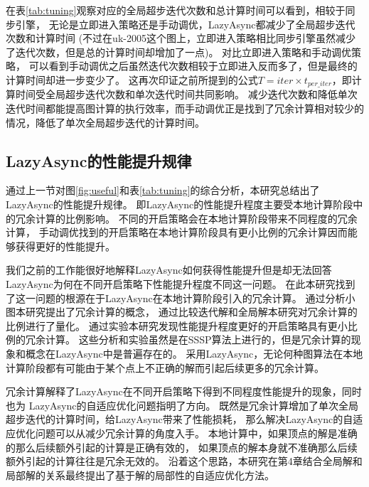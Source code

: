 在表\ref{tab:tuning}观察对应的全局超步迭代次数和总计算时间可以看到，相较于同步引擎，
无论是立即进入策略还是手动调优，LazyAsync都减少了全局超步迭代次数和计算时间
(不过在uk-2005这个图上，立即进入策略相比同步引擎虽然减少了迭代次数，但是总的计算时间却增加了一点)。
对比立即进入策略和手动调优策略， 可以看到手动调优之后虽然迭代次数相较于立即进入反而多了，但是最终的计算时间却进一步变少了。
这再次印证之前所提到的公式$T=iter \times t_{per\_iter}$，即计算时间受全局超步迭代次数和单次迭代时间共同影响。
减少迭代次数和降低单次迭代时间都能提高图计算的执行效率，而手动调优正是找到了冗余计算相对较少的情况，降低了单次全局超步迭代的计算时间。


\subsection{LazyAsync的性能提升规律}

通过上一节对图\ref{fig:useful}和表\ref{tab:tuning}的综合分析，本研究总结出了LazyAsync的性能提升规律。
即LazyAsync的性能提升程度主要受本地计算阶段中的冗余计算的比例影响。
不同的开启策略会在本地计算阶段带来不同程度的冗余计算，
手动调优找到的开启策略在本地计算阶段具有更小比例的冗余计算因而能够获得更好的性能提升。

我们之前的工作能很好地解释LazyAsync如何获得性能提升但是却无法回答LazyAsync为何在不同开启策略下性能提升程度不同这一问题。
在此本研究找到了这一问题的根源在于LazyAsync在本地计算阶段引入的冗余计算。
通过分析小图本研究提出了冗余计算的概念，
通过比较迭代解和全局解本研究对冗余计算的比例进行了量化。
通过实验本研究发现性能提升程度更好的开启策略具有更小比例的冗余计算。
这些分析和实验虽然是在SSSP算法上进行的，但是冗余计算的现象和概念在LazyAsync中是普遍存在的。
采用LazyAsync，无论何种图算法在本地计算阶段都有可能由于某个点上不正确的解而引起后续更多的冗余计算。

冗余计算解释了LazyAsync在不同开启策略下得到不同程度性能提升的现象，同时也为
LazyAsync的自适应优化问题指明了方向。
既然是冗余计算增加了单次全局超步迭代的计算时间，给LazyAsync带来了性能损耗，
那么解决LazyAsync的自适应优化问题可以从减少冗余计算的角度入手。
本地计算中，如果顶点的解是准确的那么后续额外引起的计算是正确有效的，
如果顶点的解本身就不准确那么后续额外引起的计算往往是冗余无效的。
沿着这个思路，本研究在第4章结合全局解和局部解的关系最终提出了基于解的局部性的自适应优化方法。


